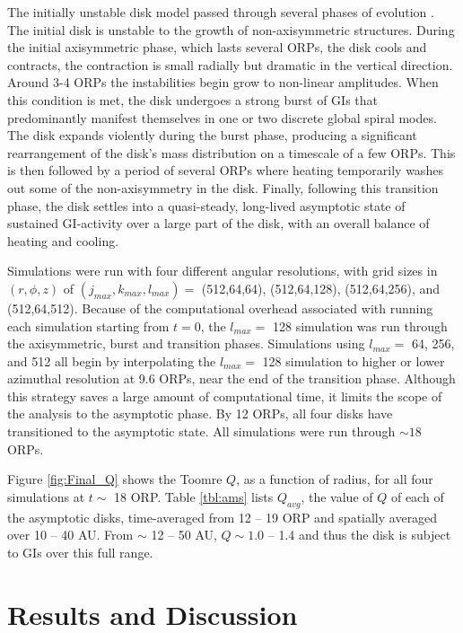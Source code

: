 \documentclass[manuscript]{aastex}
\begin{document}
The initially unstable disk model passed through several phases of evolution \citep[see also][]{pickett2003, mejia2005}.  The initial disk is unstable to the growth of non-axisymmetric structures. During the initial axisymmetric phase, 
which lasts several ORPs, the disk cools and contracts, the contraction is small radially but dramatic in the vertical direction. Around 3-4 ORPs the instabilities begin grow to non-linear amplitudes. When this condition is met, the disk undergoes a strong burst of GIs that predominantly manifest themselves in one or two discrete global spiral modes.  The disk expands violently during the burst phase, producing a significant rearrangement of the disk's mass distribution on a timescale of a few ORPs. This is then followed by a period of several ORPs where heating temporarily washes out some of the non-axisymmetry in the disk.  Finally, following this transition phase, the disk settles into a quasi-steady, long-lived asymptotic state of sustained GI-activity over a large part of the disk, with an overall balance of heating and cooling.

Simulations were run with four different angular resolutions, with grid sizes in $(r,\phi,z)$ of  $(j_{max}, k_{max}, l_{max}) =$ (512,64,64), (512,64,128), (512,64,256), and (512,64,512). Because of the computational overhead associated with running each simulation starting from $t = 0$, the $l_{max} =$ 128 simulation was run through the axisymmetric, burst and transition phases. Simulations using $l_{max} =$ 64, 256, and 512 all begin by interpolating the $l_{max} =$ 128 simulation to higher or lower azimuthal resolution at 9.6 ORPs, near the end of the transition
phase. Although this strategy saves a large amount of computational time, it limits the scope of the analysis to the asymptotic phase. By 12 ORPs, all four disks have transitioned to the asymptotic state.  All simulations were 
run through $\sim 18$ ORPs.

Figure \ref{fig:Final_Q} shows the Toomre $Q$, as a function of radius, for all four simulations at $t \sim$ 18 ORP.  Table \ref{tbl:ams} lists $Q_{avg}$, the value of $Q$ of each of the asymptotic disks, time-averaged from 12 -- 19 ORP and spatially averaged over 10 -- 40 AU.  From $\sim$ 12 -- 50 AU, $Q \sim 1.0$ -- 1.4 and thus the disk is subject to GIs over this full range.  



\section{Results and Discussion}
	
\end{document}

